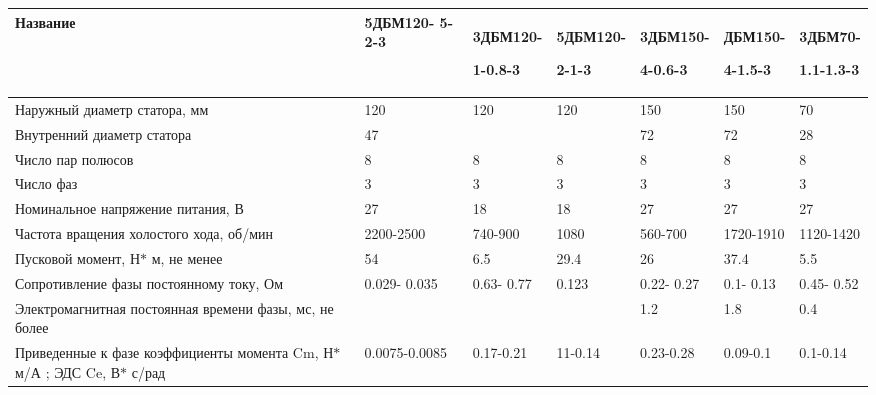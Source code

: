 \begin{landscape}




\begin{table}[!h]
	\caption{Характеристики приводов ДБМ}%
	\label{tab:DBM}%
	\begin{longtable}{|m{10cm}|m{2.2cm}|m{2.2cm}|m{2.2cm}|m{2.2cm}|m{2.2cm}|m{2.2cm}|}
		\hline
		Название & 
		5ДБМ120- 5-2-3 & 
		{3ДБМ120- \par 1-0.8-3} & 
		{5ДБМ120- \par 2-1-3} & 
		{3ДБМ150- \par 4-0.6-3} & 
		{ДБМ150- \par 4-1.5-3} & 
		{3ДБМ70- \par 1.1-1.3-3} \\
		\hline
		Наружный диаметр статора, мм & 
		120 & 
		{120} & 
		{120} & 
		{150} & 
		{150} & 
		{70} \\
		\hline
		Внутренний диаметр статора & 
		47 & 
		{} & 
		{} & 
		{72} & 
		{72} & 
		{28} \\
		\hline
		Число пар полюсов & 
		8 & 
		{8} & 
		{8} & 
		{8} & 
		{8} & 
		{8} \\
		\hline
		Число фаз & 
		3 & 
		{3} & 
		{3} & 
		{3} & 
		{3} & 
		{3} \\
		\hline
		Номинальное напряжение питания, В & 
		27 & 
		{18} & 
		{18} & 
		{27} & 
		{27} & 
		{27} \\
		\hline
		Частота вращения холостого хода, об/мин & 
		2200-2500 & 
		{740-900} & 
		{1080} & 
		{560-700} & 
		{1720-1910} & 
		{1120-1420} \\
		\hline
		Пусковой момент, Н$\ast$ м, не менее & 
		54 & 
		{6.5} & 
		{29.4} & 
		{26} & 
		{37.4} & 
		{5.5} \\
		\hline
		Сопротивление фазы постоянному току, Ом & 
		0.029- 0.035 & 
		{0.63- 0.77} & 
		{0.123} & 
		{0.22- 0.27} & 
		{0.1- 0.13} & 
		{0.45- 0.52} \\
		\hline
		Электромагнитная постоянная времени фазы, мс, не более & 
		 & 
		{} & 
		{} & 
		{1.2} & 
		{1.8} & 
		{0.4} \\
		\hline
		Приведенные к фазе коэффициенты момента Cm, Н$\ast$ м/А ; ЭДС Ce, В$\ast$ с/рад & 
		0.0075-0.0085 & 
		{0.17-0.21} & 
		{11-0.14} & 
		{0.23-0.28} & 
		{0.09-0.1} & 
		{0.1-0.14} \\

\end{longtable}
\end{table}
\end{landscape}
